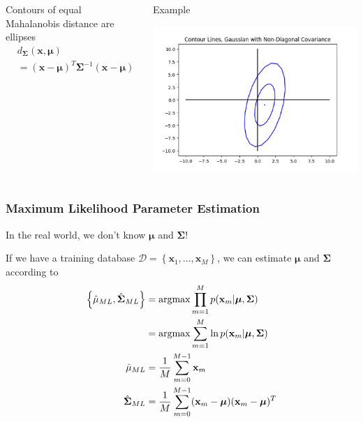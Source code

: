 \documentclass{beamer}
\newcommand{\argmax}{\operatornamewithlimits{argmax}}
\begin{document}
\begin{frame}
  \begin{columns}
    \column{2.25in}
    \begin{block}{Contours of equal Mahalanobis distance are ellipses}
      \begin{align*}
        &d_{\bm{\Sigma}}(\mathbf{x},\bm{\mu})\\
        &= (\mathbf{x}-\bm{\mu})^T\bm{\Sigma}^{-1}(\mathbf{x}-\bm{\mu})\\
      \end{align*}
    \end{block}
    \column{2in}
    \begin{block}{Example}
      \centerline{\includegraphics[width=\textwidth]{figs/covariance_example.png}}
    \end{block}
  \end{columns}    
\end{frame}

\begin{frame}
  \frametitle{Maximum Likelihood Parameter Estimation}
  In the real world, we don't know $\bm{\mu}$ and $\bm{\Sigma}$!
  
  If we have a training database ${\mathcal
    D}=\left\{\mathbf{x}_1,\ldots,\mathbf{x}_{M}\right\}$, we can
  estimate $\bm{\mu}$ and $\bm{\Sigma}$ according to
  \begin{align*}
    \left\{\hat\mu_{ML},\hat{\bm{\Sigma}}_{ML}\right\} &= \argmax
    \prod_{m=1}^{M} p(\mathbf{x}_m|\bm{\mu},\bm{\Sigma})\\
    &= \argmax
    \sum_{m=1}^{M} \ln p(\mathbf{x}_m|\bm{\mu},\bm{\Sigma})\\
    \hat{\mu}_{ML} &= \frac{1}{M}\sum_{m=0}^{M-1}\mathbf{x}_m\\
    \hat{\bm{\Sigma}}_{ML} &= \frac{1}{M}\sum_{m=0}^{M-1}(\mathbf{x}_m-\bm{\mu})(\mathbf{x}_m-\bm{\mu})^T
  \end{align*}
\end{frame}
\end{document}
